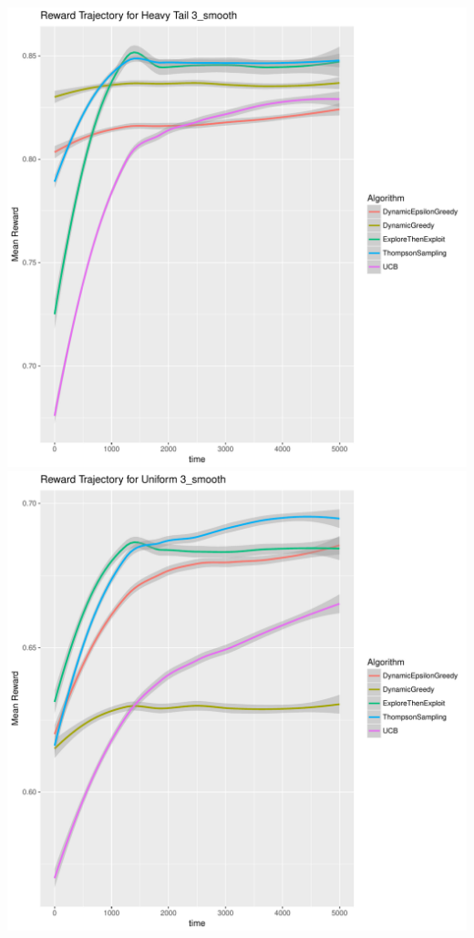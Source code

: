 \documentclass[11pt,letterpaper]{article}
\begin{document}
\includegraphics[scale=0.5]{"../results/Reward Trajectory for Heavy Tail 3_smooth"}
\\
\includegraphics[scale=0.5]{"../results/Reward Trajectory for Uniform 3_smooth"}
\\
\end{document}
